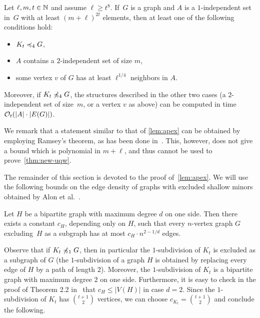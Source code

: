 \begin{lemma}\label{lem:apex}
Let $\ell,m,t\in \mathbb{N}$ and assume $\ell\geq t^{8}$. 
If~$G$ is a graph and $A$ is a $1$-independent set in~$G$
with at least $(m+\ell)^{2t}$ elements,
then at least one of the following conditions hold:
\begin{itemize}
  \item $K_t\preccurlyeq_{4} G$,
\item  $A$ contains a $2$-independent set of size $m$, 
\item  some vertex $v$ of $G$
has at least $\ell^{1/4}$ neighbors in $A$.
\end{itemize}
Moreover, if $K_t\not\preccurlyeq_4G$, the
structures described in the other two cases (a $2$-independent set 
of size~$m$, or a vertex $v$ as above) can be 
computed in time $\mathcal{O}_t(|A|\cdot |E(G)|)$. 
\end{lemma}
We remark that a statement similar to that of \cref{lem:apex}
can be obtained by employing Ramsey's theorem, as has been done in~\cite{nevsetvril2011nowhere}. This, however, 
does not give a bound which is polynomial in $m+\ell$, and thus cannot be used to prove~\cref{thm:new-uqw}.

\medskip
The remainder of this section is devoted to the proof of~\cref{lem:apex}.
We will use the following bounds on the edge density
of graphs with excluded shallow minors obtained
by Alon et al.~\cite{alon2003turan}. 

\begin{lemma}\label{lem:densitynd}
Let $H$ be a bipartite graph with maximum degree
$d$ on one side. Then there exists a constant $c_H$, depending 
only on $H$, such that every $n$-vertex graph $G$
excluding~$H$ as a subgraph has at most $c_H\cdot n^{2-1/d}$
edges. 
\end{lemma} 

Observe that if $K_t\not\preccurlyeq_1G$, then in particular
the $1$-subdivision of $K_t$ is excluded as a subgraph
of $G$ (the $1$-subdivision of a graph $H$ is obtained by 
replacing every edge of $H$ by a path of length $2$). 
Moreover, the $1$-subdivision of 
$K_t$ is a bipartite graph with maximum degree $2$ on one
side. Furthermore, it is easy to check in the 
proof of Theorem 2.2 in~\cite{alon2003turan} 
that $c_H\leq |V(H)|$
in case $d=2$. Since the $1$-subdivision of $K_t$ has 
$\binom{t+1}{2}$ vertices, we can choose $c_{K_t}=\binom{t+1}{2}$ and
conclude the following.   


